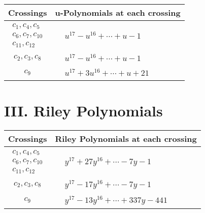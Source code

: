 \documentclass[1p]{elsarticle_modified}
\theoremstyle{definition}
\begin{document}
\begin{tabular}{m{50pt}|m{274pt}}
Crossings & \hspace{64pt}u-Polynomials at each crossing \\
\hline $$\begin{aligned}c_{1},c_{4},c_{5}\\c_{6},c_{7},c_{10}\\c_{11},c_{12}\end{aligned}$$&$\begin{aligned}
&u^{17}- u^{16}+\cdots+u-1
\end{aligned}$\\
\hline $$\begin{aligned}c_{2},c_{3},c_{8}\end{aligned}$$&$\begin{aligned}
&u^{17}- u^{16}+\cdots+u-1
\end{aligned}$\\
\hline $$\begin{aligned}c_{9}\end{aligned}$$&$\begin{aligned}
&u^{17}+3 u^{16}+\cdots+u+21
\end{aligned}$\\
\hline
\end{tabular}\newpage\renewcommand{\arraystretch}{1}
\centering \section*{ III. Riley Polynomials}
\begin{tabular}{m{50pt}|m{274pt}}
Crossings & \hspace{64pt}Riley Polynomials at each crossing \\
\hline $$\begin{aligned}c_{1},c_{4},c_{5}\\c_{6},c_{7},c_{10}\\c_{11},c_{12}\end{aligned}$$&$\begin{aligned}
&y^{17}+27 y^{16}+\cdots-7 y-1
\end{aligned}$\\
\hline $$\begin{aligned}c_{2},c_{3},c_{8}\end{aligned}$$&$\begin{aligned}
&y^{17}-17 y^{16}+\cdots-7 y-1
\end{aligned}$\\
\hline $$\begin{aligned}c_{9}\end{aligned}$$&$\begin{aligned}
&y^{17}-13 y^{16}+\cdots+337 y-441
\end{aligned}$\\
\hline
\end{tabular}
\vskip 2pc
\end{document}
